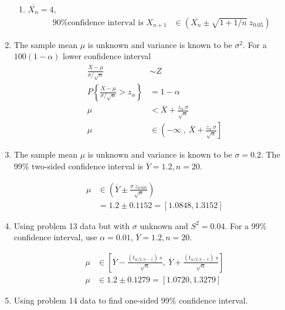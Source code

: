 \begin{enumerate}
\begin{enumerate}
			\item $ \overline{X_n} = 4 $,
			\begin{align}
				\text{90\% confidence interval is } X_{n+1} &\in \left(\overline{X_n} \pm \sqrt{1 + 1/n}\ z_{0.05}\right)
			\end{align}
			
		\end{enumerate}
	
	
	\item The sample mean $ \mu $ is unknown and variance is known to be $ \sigma^2 $. For a $ 100(1-\alpha) $ lower confidence interval \\
	
	
		\begin{align}
			\frac{\overline{X} - \mu}{\sigma / \sqrt{n}} &\sim Z \nonumber \\
			P \left\{\frac{\overline{X} - \mu}{\sigma / \sqrt{n}} > z_\alpha\right\} &= 1 - \alpha\\
			\mu &< \overline{X} + \frac{z_\alpha\ \sigma}{\sqrt{n}} \nonumber \\
			\mu &\in \left(-\infty\ ,\ \overline{X} + \frac{z_\alpha\ \sigma}{\sqrt{n}}\right]
		\end{align}
	
	
	\item The sample mean $ \mu $ is unknown and variance is known to be $ \sigma = 0.2 $. The 99\% two-sided confidence interval is
	$ \overline{Y} = 1.2, n = 20$.
	
		\begin{align}
			\mu &\in \left(\overline{Y} \pm \frac{\sigma\ z_{0.005}}{\sqrt{n}}\right) \nonumber \\
			&= 1.2 \pm 0.1152 = [1.0848, 1.3152] 
		\end{align}
	
	
	\item Using problem 13 data but with $ \sigma $ unknown and $ S^2 = 0.04 $. For a 99\% confidence interval, use $ \alpha = 0.01 $, $ \overline{Y} = 1.2, n = 20$.
	
		\begin{align}
			\mu &\in \left[ \overline{Y} - \frac{(t_{\alpha/2, n-1})\ s}{\sqrt{n}}, \ \overline{Y} + \frac{(t_{\alpha/2, n-1})\ s}{\sqrt{n}} \right] \nonumber \\
			\mu &\in 1.2 \pm 0.1279 = [1.0720, 1.3279]
		\end{align}
	
	
	\item Using problem 14 data to find one-sided 99\% confidence interval.
	

\end{enumerate}
